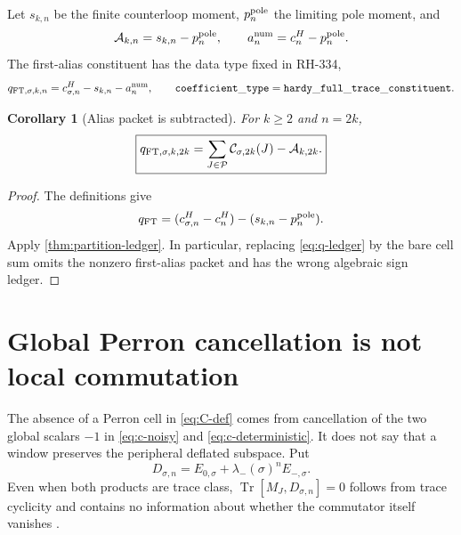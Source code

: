 \documentclass[11pt]{article}
\newtheorem{corollary}[theorem]{Corollary}
\theoremstyle{remark}
\newcommand{\Tr}{\operatorname{Tr}}
\newcommand{\cA}{\mathcal A}
\newcommand{\cC}{\mathcal C}
\newcommand{\cP}{\mathcal P}
\begin{document}
Let $s_{k,n}$ be the finite counterloop moment,
$p_n^{\rm pole}$ the limiting pole moment, and
\begin{equation}\label{eq:alias-anchor}
 \cA_{k,n}=s_{k,n}-p_n^{\rm pole},
 \qquad
 a_n^{\rm num}=c^H_n-p_n^{\rm pole}.
\end{equation}
The first-alias constituent has the data type fixed in RH-334,
\begin{equation}\label{eq:q-type}
 q_{{\rm FT},\sigma,k,n}
 =c^H_{\sigma,n}-s_{k,n}-a_n^{\rm num},
 \qquad
 \mathtt{coefficient\_type}
 =\mathtt{hardy\_full\_trace\_constituent}.
\end{equation}

\begin{corollary}[Alias packet is subtracted]\label{cor:first-alias}
For $k\ge2$ and $n=2k$,
\begin{equation}\label{eq:q-ledger}
 \boxed{
 q_{{\rm FT},\sigma,k,2k}
 =\sum_{J\in\cP}\cC_{\sigma,2k}(J)-\cA_{k,2k}.}
\end{equation}
\end{corollary}

\begin{proof}
The definitions give
\[
 q_{\rm FT}
 =(c^H_{\sigma,n}-c^H_n)-(s_{k,n}-p_n^{\rm pole}).
\]
Apply \cref{thm:partition-ledger}.  In particular, replacing
\eqref{eq:q-ledger} by the bare cell sum omits the nonzero first-alias packet
and has the wrong algebraic sign ledger.
\end{proof}

\section{Global Perron cancellation is not local commutation}

The absence of a Perron cell in \eqref{eq:C-def} comes from cancellation of
the two global scalars $-1$ in \eqref{eq:c-noisy} and
\eqref{eq:c-deterministic}.  It does not say that a window preserves the
peripheral deflated subspace.  Put
\begin{equation}\label{eq:deflation}
 D_{\sigma,n}=E_{0,\sigma}+\lambda_-(\sigma)^nE_{-,\sigma}.
\end{equation}
Even when both products are trace class,
$\Tr[M_J,D_{\sigma,n}]=0$ follows from trace cyclicity and contains no
information about whether the commutator itself vanishes
\citep{Simon2005}.
\end{document}
